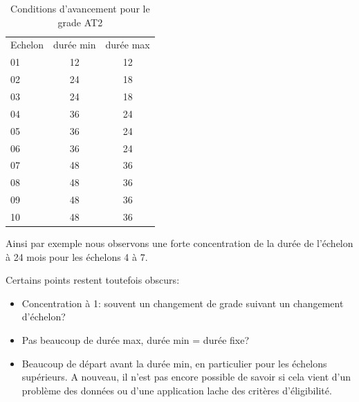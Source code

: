 \documentclass[11pt,a4paper]{article}
\begin{document}
\begin{table}[h!]
\label{means}
\centering
\caption{Conditions d'avancement pour le grade AT2} 
\footnotesize
\begin{tabular}{l|cc}
\toprule
Echelon &  durée min &  durée max \\
01  &12	&12 \\
02	&24	&18 \\
03	&24	&18\\
04	&36	&24\\
05	&36	&24 \\
06	&36	&24 \\
07	&48	&36 \\
08	&48	&36 \\
09	&48	&36 \\
10	&48	&36	 \\
%	
\bottomrule
\end{tabular}
\end{table}


Ainsi par exemple nous observons une forte concentration de la durée de l'échelon à 24 mois pour les échelons 4 à 7. 
 

Certains points restent toutefois obscurs:
\begin{itemize}[leftmargin=1cm ,parsep=0cm,itemsep=0cm,topsep=0cm] 
\item Concentration à 1: souvent un changement de grade suivant un changement d'échelon?
\item Pas beaucoup de durée max, durée min = durée fixe?
\item Beaucoup de départ avant la durée min, en particulier pour les  échelons supérieurs. A nouveau, il n'est pas encore possible de savoir si cela vient d'un problème des données ou d'une application lache des critères d'éligibilité. 
\end{itemize}
\end{document}
